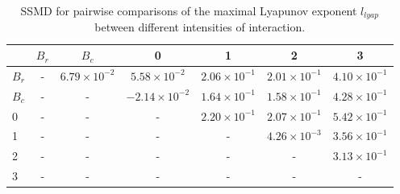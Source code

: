 \begin{table}
\centering
\caption{SSMD for pairwise comparisons of the maximal Lyapunov exponent $l_{lyap}$ between different intensities of interaction.}
\label{tab:ssmd_lyapunov}
\begin{tabular}{lcccccc}
\toprule
 & $B_r$ & $B_c$ & 0 & 1 & 2 & 3 \\
\midrule
$B_r$ & - & $6.79 \times 10^{-2}$ & $5.58 \times 10^{-2}$ & $2.06 \times 10^{-1}$ & $2.01 \times 10^{-1}$ & $4.10 \times 10^{-1}$ \\
$B_c$ & - & - & $-2.14 \times 10^{-2}$ & $1.64 \times 10^{-1}$ & $1.58 \times 10^{-1}$ & $4.28 \times 10^{-1}$ \\
0 & - & - & - & $2.20 \times 10^{-1}$ & $2.07 \times 10^{-1}$ & $5.42 \times 10^{-1}$ \\
1 & - & - & - & - & $4.26 \times 10^{-3}$ & $3.56 \times 10^{-1}$ \\
2 & - & - & - & - & - & $3.13 \times 10^{-1}$ \\
3 & - & - & - & - & - & - \\
\bottomrule
\end{tabular}
\end{table}
